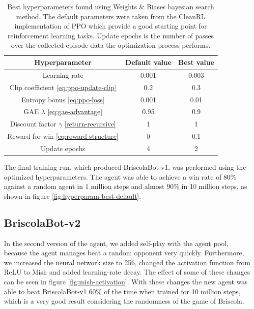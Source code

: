 \begin{table}[H]
    \centering
    \begin{tabular}{ccc}
        \hline
        Hyperparameter & Default value & Best value \\
        \hline
        Learning rate & 0.001 & 0.003 \\
        Clip coefficient \eqref{eq:ppo-update-clip} & 0.2 & 0.3\\
        Entropy bonus \eqref{eq:ppo-loss} & 0.001 & 0.01 \\
        GAE $\lambda$ \eqref{eq:gae-advantage} & 0.95 & 0.9 \\
        Discount factor $\gamma$ \eqref{return-recursive} & 1 & 1 \\
        Reward for win \eqref{eq:reward-structure} & 0 & 0.1 \\
        Update epochs & 4 & 2 \\
    \end{tabular}
    \caption{Best hyperparameters found using Weights \& Biases bayesian search method. The default parameters were taken from the CleanRL implementation of PPO \cite{huang2022cleanrl} which provide a good starting point for reinforcement learning tasks. Update epochs is the number of passes over the collected episode data the optimization process performs.}
    \label{tab:hyperparam-best}
\end{table}

The final training run, which produced BriscolaBot-v1, was performed using the optimized hyperparameters. The agent was able to achieve a win rate of 80\% against a random agent in 1 million steps and almost 90\% in 10 million steps, as shown in figure \ref{fig:hyperparam-best-default}.

\subsection{BriscolaBot-v2}
In the second version of the agent, we added self-play with the agent pool, because the agent manages beat a random opponent very quickly. Furthermore, we increased the neural network size to 256, changed the activation function from ReLU to Mish \cite{misra2019mish} and added learning-rate decay. The effect of some of these changes can be seen in figure \ref{fig:mish-activation}. With these changes the new agent was able to beat BriscolaBot-v1 60\% of the time when trained for 10 million steps, which is a very good result considering the randomness of the game of Briscola.

